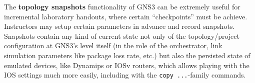 The \textbf{topology snapshots} functionality of GNS3 can be extremely useful for incremental laboratory handouts, where certain ``checkpoints'' must be achieve.
Instructors may setup certain parameters in advance and record snapshots.
Snapshots contain any kind of current state not only of the topology/project configuration at GNS3's level itself (in the role of the orchestrator, link simulation parameters like package loss rate, etc.) but also the persisted state of emulated devices, like Dynamips or IOSv routers, which allows playing with the IOS settings much more easily, including with the \texttt{copy ...}-family commands.




